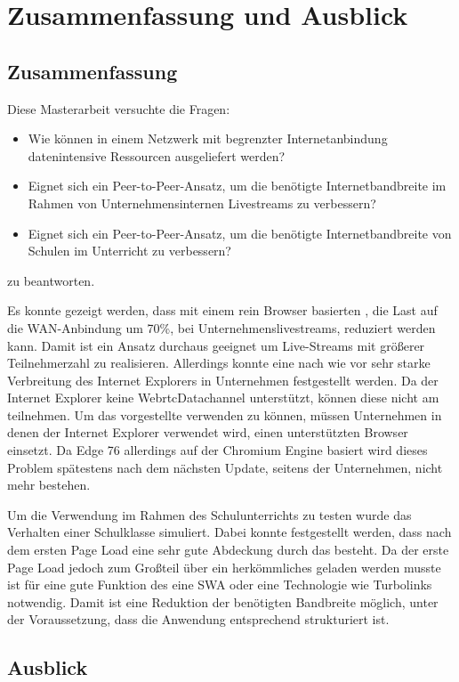 \chapter{Zusammenfassung und Ausblick}
\section{Zusammenfassung}

Diese Masterarbeit versuchte die Fragen:
\begin{itemize}
	\item Wie können in einem Netzwerk mit begrenzter Internetanbindung datenintensive Ressourcen ausgeliefert werden?
	\item Eignet sich ein Peer-to-Peer-Ansatz, um die benötigte Internetbandbreite im Rahmen von Unternehmensinternen Livestreams zu verbessern?
	\item Eignet sich ein Peer-to-Peer-Ansatz, um die benötigte Internetbandbreite von Schulen im Unterricht zu verbessern?
\end{itemize}
zu beantworten.

Es konnte gezeigt werden, dass mit einem rein Browser basierten \cdn, die Last auf die WAN-Anbindung um 70\%, bei Unternehmenslivestreams, reduziert werden kann. Damit ist ein \pTp Ansatz durchaus geeignet um Live-Streams mit größerer Teilnehmerzahl zu realisieren. Allerdings konnte eine nach wie vor sehr starke Verbreitung des Internet Explorers in Unternehmen festgestellt werden. Da der Internet Explorer keine WebrtcDatachannel unterstützt, können diese nicht am \pTp \cdn teilnehmen. Um das vorgestellte \cdn verwenden zu können, müssen Unternehmen in denen der Internet Explorer verwendet wird, einen unterstützten Browser einsetzt. Da Edge 76 allerdings auf der Chromium Engine basiert wird dieses Problem spätestens nach dem nächsten Update, seitens der Unternehmen, nicht mehr bestehen. 

Um die Verwendung im Rahmen des Schulunterrichts zu testen wurde das Verhalten einer Schulklasse simuliert. Dabei konnte festgestellt werden, dass nach dem ersten Page Load eine sehr gute Abdeckung durch das \pTp \cdn besteht. Da der erste Page Load jedoch zum Großteil über ein herkömmliches \cdn geladen werden musste ist für eine gute Funktion des \pTp \cdns eine SWA oder eine Technologie wie Turbolinks notwendig. Damit ist eine Reduktion der benötigten Bandbreite möglich, unter der Voraussetzung, dass die Anwendung entsprechend strukturiert ist. 

\section{Ausblick}

